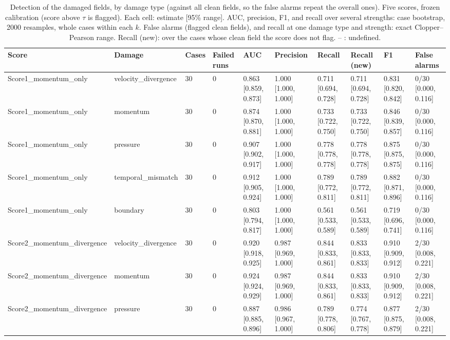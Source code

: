\begin{table}
\caption{Detection of the damaged fields, by damage type (against all clean fields, so the false alarms repeat the overall ones). Five scores, frozen calibration (score above $\tau$ is flagged). Each cell: estimate [95\% range]. AUC, precision, F1, and recall over several strengths: case bootstrap, 2000 resamples, whole cases within each $k$. False alarms (flagged clean fields), and recall at one damage type and strength: exact Clopper--Pearson range. Recall (new): over the cases whose clean field the score does not flag. -- : undefined.}
\label{tab:benchmark_metrics_by_type}
\begin{tabular}{llllllllll}
\toprule
Score & Damage & Cases & Failed runs & AUC & Precision & Recall & Recall (new) & F1 & False alarms \\
\midrule
Score1\_momentum\_only & velocity\_divergence & 30 & 0 & 0.863 [0.859, 0.873] & 1.000 [1.000, 1.000] & 0.711 [0.694, 0.728] & 0.711 [0.694, 0.728] & 0.831 [0.820, 0.842] & 0/30 [0.000, 0.116] \\
Score1\_momentum\_only & momentum & 30 & 0 & 0.874 [0.870, 0.881] & 1.000 [1.000, 1.000] & 0.733 [0.722, 0.750] & 0.733 [0.722, 0.750] & 0.846 [0.839, 0.857] & 0/30 [0.000, 0.116] \\
Score1\_momentum\_only & pressure & 30 & 0 & 0.907 [0.902, 0.917] & 1.000 [1.000, 1.000] & 0.778 [0.778, 0.778] & 0.778 [0.778, 0.778] & 0.875 [0.875, 0.875] & 0/30 [0.000, 0.116] \\
Score1\_momentum\_only & temporal\_mismatch & 30 & 0 & 0.912 [0.905, 0.924] & 1.000 [1.000, 1.000] & 0.789 [0.772, 0.811] & 0.789 [0.772, 0.811] & 0.882 [0.871, 0.896] & 0/30 [0.000, 0.116] \\
Score1\_momentum\_only & boundary & 30 & 0 & 0.803 [0.794, 0.817] & 1.000 [1.000, 1.000] & 0.561 [0.533, 0.589] & 0.561 [0.533, 0.589] & 0.719 [0.696, 0.741] & 0/30 [0.000, 0.116] \\
Score2\_momentum\_divergence & velocity\_divergence & 30 & 0 & 0.920 [0.918, 0.925] & 0.987 [0.969, 1.000] & 0.844 [0.833, 0.861] & 0.833 [0.833, 0.833] & 0.910 [0.909, 0.912] & 2/30 [0.008, 0.221] \\
Score2\_momentum\_divergence & momentum & 30 & 0 & 0.924 [0.924, 0.929] & 0.987 [0.969, 1.000] & 0.844 [0.833, 0.861] & 0.833 [0.833, 0.833] & 0.910 [0.909, 0.912] & 2/30 [0.008, 0.221] \\
Score2\_momentum\_divergence & pressure & 30 & 0 & 0.887 [0.885, 0.896] & 0.986 [0.967, 1.000] & 0.789 [0.778, 0.806] & 0.774 [0.767, 0.778] & 0.877 [0.875, 0.879] & 2/30 [0.008, 0.221] \\

\end{tabular}
\end{table}
